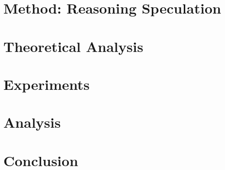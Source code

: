 \documentclass{article}
\newcommand{\fullmethod}{Reasoning Speculation}
\theoremstyle{remark}
\begin{document}


\section{Method: \fullmethod{}}
\label{sec:method}



\section{Theoretical Analysis}
\label{sec:theory}



\section{Experiments}
\label{sec:experiments}



\section{Analysis}
\label{sec:analysis}



\section{Conclusion}
\label{sec:conclusion}







\appendix

\end{document}
